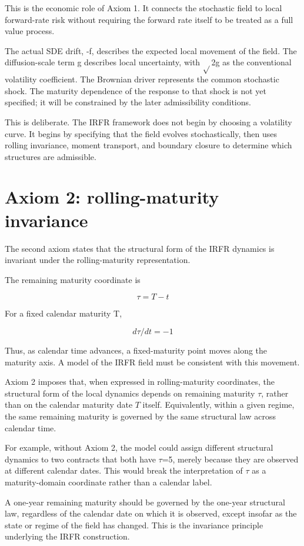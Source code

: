 \documentclass[11pt,oneside]{book}
\begin{document}
This is the economic role of Axiom 1. It connects the stochastic field
to local forward-rate risk without requiring the forward rate itself to
be treated as a full value process.

The actual SDE drift, -f, describes the expected local movement of the
field. The diffusion-scale term g describes local uncertainty, with $\sqrt{}$2g
as the conventional volatility coefficient. The Brownian driver
represents the common stochastic shock. The maturity dependence of the
response to that shock is not yet specified; it will be constrained by
the later admissibility conditions.

This is deliberate. The IRFR framework does not begin by choosing a
volatility curve. It begins by specifying that the field evolves
stochastically, then uses rolling invariance, moment transport, and
boundary closure to determine which structures are admissible.

\section{Axiom 2: rolling-maturity
invariance}\label{axiom-2-rolling-maturity-invariance}

The second axiom states that the structural form of the IRFR dynamics is
invariant under the rolling-maturity representation.

The remaining maturity coordinate is

\[
\tau = T - t
\]

For a fixed calendar maturity T,

\[
d\tau/dt = -1
\]

Thus, as calendar time advances, a fixed-maturity point moves along the
maturity axis. A model of the IRFR field must be consistent with this
movement.

Axiom 2 imposes that, when expressed in rolling-maturity coordinates,
the structural form of the local dynamics depends on remaining maturity
$\tau$, rather than on the calendar maturity date \(T\) itself. Equivalently,
within a given regime, the same remaining maturity is governed by the
same structural law across calendar time.

For example, without Axiom 2, the model could assign different
structural dynamics to two contracts that both have $\tau$=5, merely because
they are observed at different calendar dates. This would break the
interpretation of $\tau$ as a maturity-domain coordinate rather than a
calendar label.

A one-year remaining maturity should be governed by the one-year
structural law, regardless of the calendar date on which it is observed,
except insofar as the state or regime of the field has changed. This is
the invariance principle underlying the IRFR construction.
\end{document}
